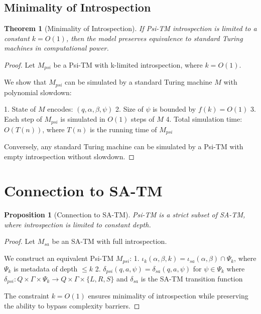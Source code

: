 \documentclass[11pt]{article}
\newtheorem{theorem}{Theorem}
\newtheorem{proposition}{Proposition}
\begin{document}
\subsection{Minimality of Introspection}

\begin{theorem}[Minimality of Introspection]
If Psi-TM introspection is limited to a constant $k = O(1)$, then the model preserves equivalence to standard Turing machines in computational power.
\end{theorem}

\begin{proof}
Let $M_{psi}$ be a Psi-TM with k-limited introspection, where $k = O(1)$.

We show that $M_{psi}$ can be simulated by a standard Turing machine $M$ with polynomial slowdown:

1. State of $M$ encodes: $(q, \alpha, \beta, \psi)$
2. Size of $\psi$ is bounded by $f(k) = O(1)$
3. Each step of $M_{psi}$ is simulated in $O(1)$ steps of $M$
4. Total simulation time: $O(T(n))$, where $T(n)$ is the running time of $M_{psi}$

Conversely, any standard Turing machine can be simulated by a Psi-TM with empty introspection without slowdown.
\end{proof}

\section{Connection to SA-TM}

\begin{proposition}[Connection to SA-TM]
Psi-TM is a strict subset of SA-TM, where introspection is limited to constant depth.
\end{proposition}

\begin{proof}
Let $M_{sa}$ be an SA-TM with full introspection.

We construct an equivalent Psi-TM $M_{psi}$:
1. $\iota_k(\alpha, \beta, k) = \iota_{sa}(\alpha, \beta) \cap \Psi_k$, where $\Psi_k$ is metadata of depth $\leq k$
2. $\delta_{psi}(q, a, \psi) = \delta_{sa}(q, a, \psi)$ for $\psi \in \Psi_k$ where $\delta_{psi}: Q \times \Gamma \times \Psi_k \to Q \times \Gamma \times \{L, R, S\}$ and $\delta_{sa}$ is the SA-TM transition function

The constraint $k = O(1)$ ensures minimality of introspection while preserving the ability to bypass complexity barriers.
\end{proof}
\end{document}

